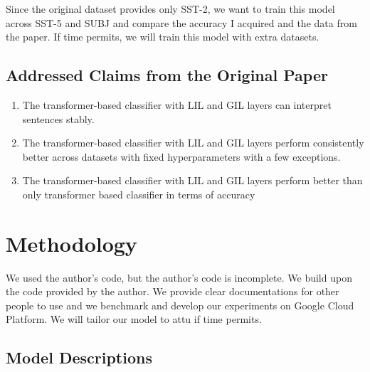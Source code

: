 \documentclass{article}
\begin{document}
Since the original dataset provides only SST-2, we want to train this model across SST-5 and 
SUBJ and compare the accuracy I acquired and the data from the paper. If time permits, we 
will train this model with extra datasets. 

\subsection{Addressed Claims from the Original Paper} \label{claims}

\begin{enumerate}
    \item The transformer-based classifier with LIL and GIL layers can interpret sentences stably.
    \item The transformer-based classifier with LIL and GIL layers perform consistently better 
    across datasets with fixed hyperparameters with a few exceptions.
    \item The transformer-based classifier with LIL and GIL layers perform better than only transformer
    based classifier in terms of accuracy
\end{enumerate}


\section{Methodology}

We used the author's code, but the author's code is incomplete. We build upon the code 
provided by the author. We provide clear documentations for other people to use and we 
benchmark and develop our experiments on Google Cloud Platform. We will tailor our model
to attu if time permits.


\subsection{Model Descriptions}
\end{document}
